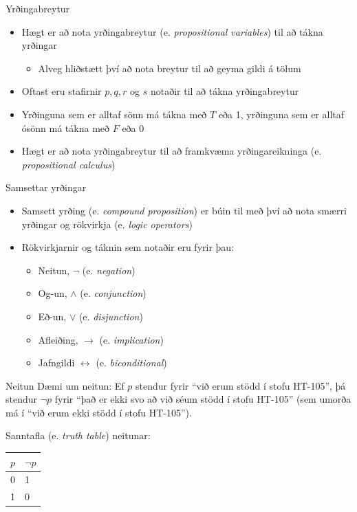 \documentclass{beamer}
\begin{document}
\begin{frame}{Yrðingabreytur}
\begin{itemize}
 \item Hægt er að nota yrðingabreytur (e. \emph{propositional variables}) til að tákna yrðingar
 \begin{itemize}
  \item Alveg hliðstætt því að nota breytur til að geyma gildi á tölum
 \end{itemize}
 \item Oftast eru stafirnir $p, q, r$ og $s$ notaðir til að tákna yrðingabreytur
 \item Yrðinguna sem er alltaf sönn má tákna með $T$ eða 1, yrðinguna sem er alltaf ósönn má tákna með $F$ eða 0
 \item Hægt er að nota yrðingabreytur til að framkvæma yrðingareikninga (e. \emph{propositional calculus})
\end{itemize}
\end{frame}

\begin{frame}{Samsettar yrðingar}
\begin{itemize}
 \item Samsett yrðing (e. \emph{compound proposition}) er búin til með því að nota smærri yrðingar og rökvirkja (e. \emph{logic operators})
 \item Rökvirkjarnir og táknin sem notaðir eru fyrir þau:
 \begin{itemize}
  \item Neitun, $\lnot$ (e. \emph{negation})
  \item Og-un, $\land$ (e. \emph{conjunction})
  \item Eð-un, $\lor$ (e. \emph{disjunction})
  \item Afleiðing, $\to$ (e. \emph{implication})
  \item Jafngildi $\leftrightarrow$ (e. \emph{biconditional})
 \end{itemize}
\end{itemize}
\end{frame}

\begin{frame}{Neitun}
Dæmi um neitun: Ef $p$ stendur fyrir ``við erum stödd í stofu HT-105'', þá stendur $\lnot p$ fyrir ``það er ekki svo að við séum stödd í stofu HT-105'' (sem umorða má í ``við erum ekki stödd í stofu HT-105'').

\vspace*{0.5cm}
Sanntafla (e. \emph{truth table}) neitunar:

\begin{center}
\begin{tabular}{ll}
\toprule
$p$&$\lnot p$\\
\midrule
0&1\\
1&0\\
\bottomrule
\end{tabular}
\end{center}
\end{frame}
\end{document}
